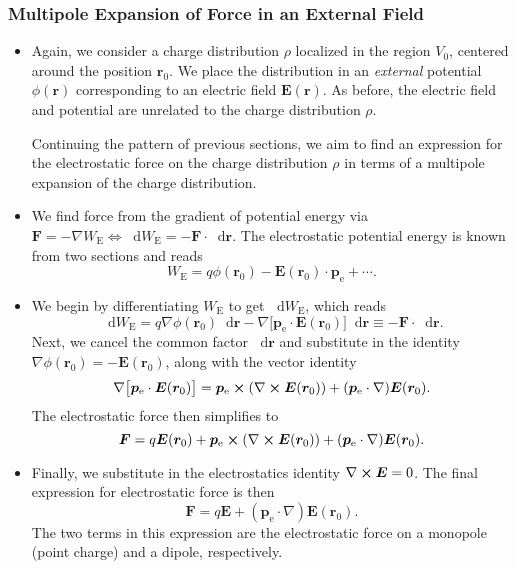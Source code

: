 \documentclass[11pt, a4paper]{article}
\newcommand{\diff}{\mathop{}\!\mathrm{d}} %
\renewcommand{\vec}[1]{\bm{#1}} %
\renewcommand{\r}{\vec{r}}
\newcommand{\E}{\vec{E}} %
\newcommand{\pe}{\vec{p}_{\text{e}}}  %
\renewcommand{\curl}{\nabla \cross}
\renewcommand{\grad}{\nabla}
\begin{document}
\subsubsection{Multipole Expansion of Force in an External Field}

\begin{itemize}
	\item Again, we consider a charge distribution $ \rho $ localized in the region $ V_{0} $, centered around the position $ \r_{0} $. We place the distribution in an \textit{external} potential $ \phi(\r) $ corresponding to an electric field $ \E(\r) $. As before, the electric field and potential are unrelated to the charge distribution $ \rho $.
	
    Continuing the pattern of previous sections, we aim to find an expression for the electrostatic force on the charge distribution $ \rho $ in terms of a multipole expansion of the charge distribution. 
	
	\item We find force from the gradient of potential energy via $ \vec{F} = - \grad W_{\text{E}} \iff \diff W_{\text{E}} = - \vec{F} \cdot \diff \r $. The electrostatic potential energy is known from two sections and reads
    \begin{equation*}
        W_{\text{E}} = q \phi(\r_{0}) - \E(\r_{0}) \cdot \pe + \cdots. 
    \end{equation*}

	\item We begin by differentiating $ W_{\text{E}} $ to get $ \diff W_{\text{E}} $, which reads
	\begin{equation*}
		\diff W_{\text{E}} = q \grad \phi(\r_{0})\diff \r - \grad \big[\pe \cdot \E(\r_{0})\big]\diff \r \equiv - \vec{F} \cdot \diff \r.
	\end{equation*}
	Next, we cancel the common factor $ \diff \r $ and substitute in the identity $ \grad \phi(\r_{0}) = - \E(\r_{0}) $, along with the vector identity 
	\begin{equation*}
		\grad\big[\pe \cdot \E(\r_{0})\big] = \pe \cross (\curl \E(\r_{0})) + (\pe \cdot \grad)\E(\r_{0}).
	\end{equation*}
    The electrostatic force then simplifies to
    \begin{equation*}
        \vec{F} = q \E(\r_{0}) + \pe \cross (\curl \E(\r_{0})) + (\pe \cdot \grad)\E(\r_{0}).
    \end{equation*}
    
    \item Finally, we substitute in the electrostatics identity $ \curl \E = 0 $. The final expression for electrostatic force is then
	\begin{equation*}
		\vec{F} = q \E + (\pe \cdot \grad)\E(\r_{0}).
	\end{equation*}
    The two terms in this expression are the electrostatic force on a monopole (point charge) and a dipole, respectively.
	
\end{itemize}
\end{document}
